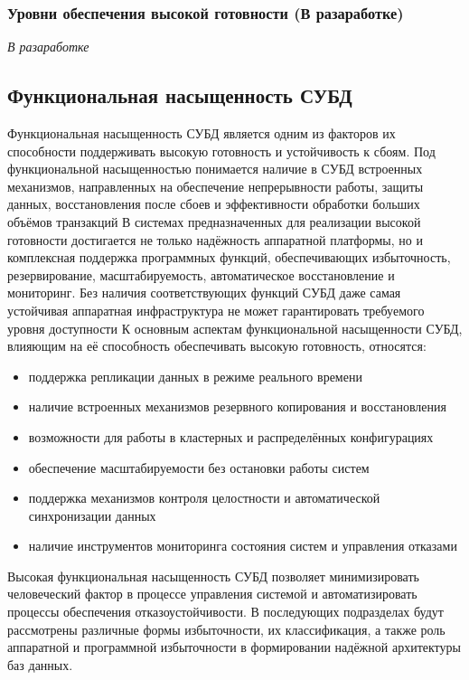 \subsubsection{Уровни обеспечения высокой готовности (В разаработке)}

\textit{В разаработке}

\subsection{Функциональная насыщенность СУБД}

Функциональная насыщенность СУБД является одним из факторов их способности поддерживать высокую готовность и устойчивость к сбоям. Под функциональной насыщенностью понимается наличие в СУБД встроенных механизмов, направленных на обеспечение непрерывности работы, защиты данных, восстановления после сбоев и эффективности обработки больших объёмов транзакций \autocite{OszuValduriez}
В системах предназначенных для реализации высокой готовности достигается не только надёжность аппаратной платформы, но и комплексная поддержка программных функций, обеспечивающих избыточность, резервирование, масштабируемость, автоматическое восстановление и мониторинг. Без наличия соответствующих функций СУБД даже самая устойчивая аппаратная инфраструктура не может гарантировать требуемого уровня доступности \autocite{Kleppmann}
К основным аспектам функциональной насыщенности СУБД, влияющим на её способность обеспечивать высокую готовность, относятся:

\begin{itemize}
    \item поддержка репликации данных в режиме реального времени
    \item наличие встроенных механизмов резервного копирования и восстановления
    \item возможности для работы в кластерных и распределённых конфигурациях
    \item обеспечение масштабируемости без остановки работы систем
    \item поддержка механизмов контроля целостности и автоматической синхронизации данных
    \item наличие инструментов мониторинга состояния систем и управления отказами
\end{itemize}

Высокая функциональная насыщенность СУБД позволяет минимизировать человеческий фактор в процессе управления системой и автоматизировать процессы обеспечения отказоустойчивости.
В последующих подразделах будут рассмотрены различные формы избыточности, их классификация, а также роль аппаратной и программной избыточности в формировании надёжной архитектуры баз данных.

